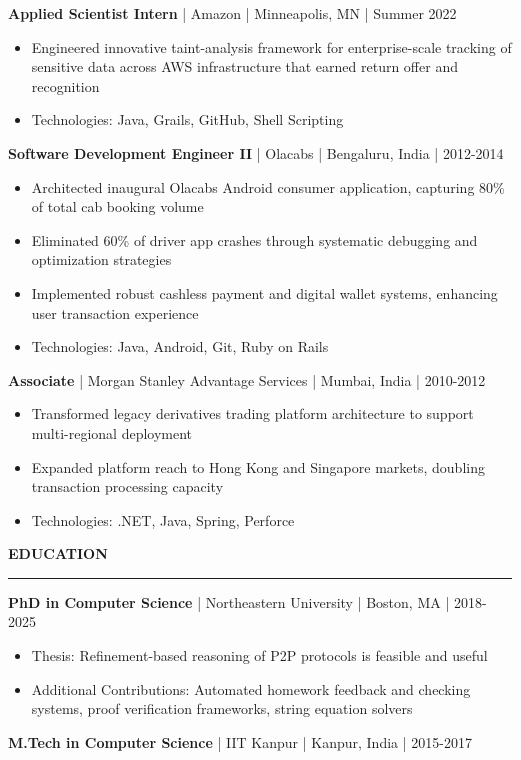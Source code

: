 \documentclass[11pt,letterpaper]{article}
\newcommand{\cvsection}[1]{
    \vspace{0.5em}
    \textbf{\large #1}
    \vspace{0.2em}
    \hrule
    \vspace{0.3em}
}
\newcommand{\cventry}[6]{
    \textbf{#1} | #2 | #3 | #4
    \vspace{0.1em}
    #6
    \vspace{0.3em}
}
\begin{document}
\cventry{Applied Scientist Intern}{Amazon}{Minneapolis, MN}{Summer 2022}{}{
\begin{itemize}
    \item Engineered innovative taint-analysis framework for enterprise-scale tracking of sensitive data across AWS infrastructure
    that earned return offer and recognition
    \item Technologies: Java, Grails, GitHub, Shell Scripting
\end{itemize}
}

\cventry{Software Development Engineer II}{Olacabs}{Bengaluru, India}{2012-2014}{}{
\begin{itemize}
    \item Architected inaugural Olacabs Android consumer application, capturing 80\% of total cab booking volume
    \item Eliminated 60\% of driver app crashes through systematic debugging and optimization strategies
    \item Implemented robust cashless payment and digital wallet systems, enhancing user transaction experience
    \item Technologies: Java, Android, Git, Ruby on Rails
\end{itemize}
}

\cventry{Associate}{Morgan Stanley Advantage Services}{Mumbai, India}{2010-2012}{}{
\begin{itemize}
    \item Transformed legacy derivatives trading platform architecture to support multi-regional deployment
    \item Expanded platform reach to Hong Kong and Singapore markets, doubling transaction processing capacity
    \item Technologies: .NET, Java, Spring, Perforce
\end{itemize}
}

\cvsection{EDUCATION}

\textbf{PhD in Computer Science} | Northeastern University | Boston, MA | 2018-2025
\begin{itemize}
    \item Thesis: Refinement-based reasoning of P2P protocols is feasible and useful
    \item Additional Contributions: Automated homework feedback and checking systems, proof verification frameworks, string equation solvers
\end{itemize}

\textbf{M.Tech in Computer Science} | IIT Kanpur | Kanpur, India | 2015-2017
\end{document}
